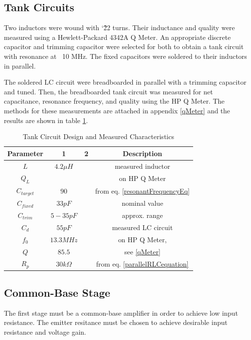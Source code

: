 \documentclass[titlepage, letterpaper, 11pt]{article}
\begin{document}
\subsection{Tank Circuits}

Two inductors were wound with \char`\~22 turns. Their inductance and quality
were measured using a Hewlett-Packard 4342A Q Meter. An appropriate
discrete capacitor and trimming capacitor were selected for both to
obtain a tank circuit with resonance at ~10 MHz. The fixed capacitors
were soldered to their inductors in parallel.

The soldered LC circuit were breadboarded in parallel with a trimming
capacitor and tuned. Then, the breadboarded tank circuit was measured
for net capacitance, resonance frequency, and quality using the HP
Q Meter. The methods for these measurements are attached in appendix
\ref{qMeter} and the results are shown in table
\ref{tankCircuitCharacteristics}.

\begin{table}[ht]
\centering
\caption{Tank Circuit Design and Measured Characteristics}
\begin{tabular}{c|c|c|c}
\hline\hline
Parameter	&1		&2	&Description	\\
\hline\hline
$L$		&$4.2\mu H$	&	&measured inductor	\\
$Q_{L}$		&		&	&on HP Q Meter	\\
\hline
$C_{target}$	&$90$		&	&from eq. \ref{resonantFrequencyEq}	\\
$C_{fixed}$	&$33pF$		&	&nominal value		\\
$C_{trim}$	&$5-35pF$	&	&approx. range		\\
\hline
$C_{d}$		&$55pF$		&	&measured LC circuit	\\
$f_{0}$		&$13.3MHz$	&	&on HP Q Meter,		\\
$Q$		&$85.5$		&	&see \ref{qMeter}	\\
$R_{p}$		&$30k\Omega$	&	&from eq. \ref{parallelRLCequation}	\\
\hline\hline
\end{tabular}
\label{tankCircuitCharacteristics}
\end{table}

\subsection{Common-Base Stage}

The first stage must be a common-base amplifier in order to achieve
low input resistance. The emitter resitance must be
chosen to achieve desirable input resistance and voltage gain.
\end{document}
